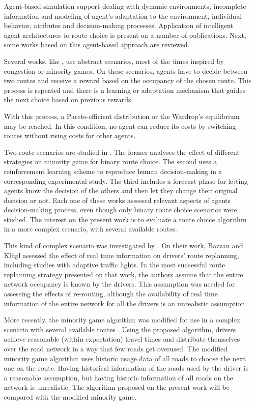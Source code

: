 \documentclass[12pt]{article}
\begin{document}
Agent-based simulation support dealing with dynamic environments, incomplete information and modeling of agent's adaptation to the environment, individual behavior, atributes and decision-making processes. Application of intelligent agent architectures to route choice is present on a number of publications. Next, some works based on this agent-based approach are reviewed.

Several works, like \cite{Bazzan+2000icmas, Chmura&Pitz2007, Kluegl&Bazzan2004}, use abstract scenarios, most of the times inspired by congestion or minority games. On these scenarios, agents have to decide between two routes and receive a reward based on the occupancy of the chosen route. This process is repeated and there is a learning or adaptation mechanism that guides the next choice based on previous rewards.

With this process, a Pareto-efficient distribution or the Wardrop's equilibrium \cite{Wardrop1952} may be reached. In this condition, no agent can reduce its costs by switching routes without rising costs for other agents. 

Two-route scenarios are studied in \cite{Bazzan+2000icmas, Chmura&Pitz2007, Kluegl&Bazzan2004}. The former analyses the effect of different strategies on minority game for binary route choice. The second uses a reinforcement learning scheme to reproduce human decision-making in a corresponding experimental study. The third includes a forecast phase for letting agents know the decision of the others and then let they change their original decision or not. Each one of these works assessed relevant aspects of agents decision-making process, even though only binary route choice scenarios were studied. The interest on the present work is to evaluate a route choice algorithm in a more complex scenario, with several available routes.

This kind of complex scenario was investigated by \cite{Bazzan&Kluegl2008}. On their work, Bazzan and Kl\"ugl assessed the effect of real time information on drivers' route replanning, including studies with adaptive traffic lights. In the most successful route replanning strategy presented on that work, the authors assume that the entire network occupancy is known by the drivers. This assumption was needed for assessing the effects of re-routing, although the availability of real time information of the entire network for all the drivers is an unrealistic assumption.

More recently, the minority game algorithm was modified for use in a complex scenario with several available routes \cite{Galib&Moser2011}. Using the proposed algorithm, drivers achieve reasonable (within expectation) travel times and distribute themselves over the road network in a way that few roads get overused. The modified minority game algorithm uses historic usage data of all roads to choose the next one on the route. Having historical information of the roads used by the driver is a reasonable assumption, but having historic information of all roads on the network is unrealistic. The algorithm proposed on the present work will be compared with the modified minority game. 
\end{document}
